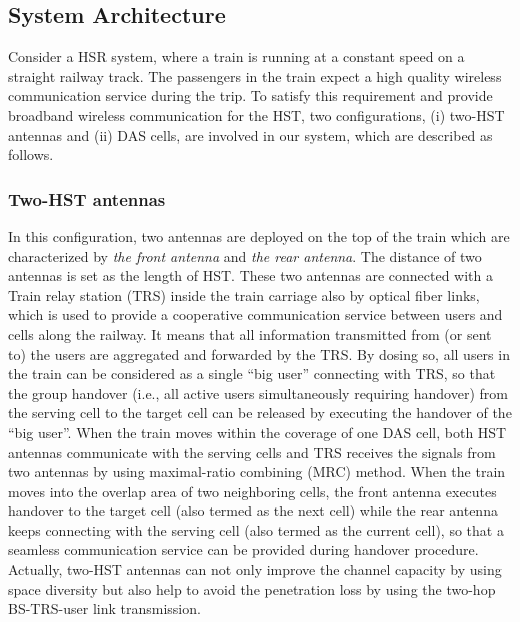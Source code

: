 \documentclass[a4paper,twocolumn,10pt]{IEEEtran}
\begin{document}
\subsection{System Architecture}
Consider a HSR system, where a train is running at a constant speed  on a straight railway track. The passengers in the train expect a high quality wireless communication service during the trip. To satisfy this requirement and provide broadband wireless communication for the HST, two configurations, (i) two-HST antennas and (ii) DAS cells, are involved in our system, which are described as follows.

\subsubsection{Two-HST antennas} In this configuration, two antennas are deployed on the top of the train which are characterized  by \textit{the front antenna} and \textit{the rear antenna}. The distance of two antennas is set as the length of HST. These two antennas are connected with a Train relay station (TRS) inside the train carriage also by optical fiber links, which is used to provide a cooperative communication service between users and cells along the railway. It means that all information transmitted from (or sent to) the users are aggregated and forwarded by the TRS. By dosing so, all users in the train can be considered as a single ``big user'' connecting with TRS, so that the group handover (i.e., all active users simultaneously requiring handover) from the serving cell to the target cell can be released by executing the handover of the ``big user''. When the train moves within the coverage of one DAS cell, both HST antennas communicate with the serving cells and TRS receives the signals from two antennas by using maximal-ratio combining (MRC) method. When the train moves into the overlap area of two neighboring cells, the front antenna executes handover to the target cell (also termed as the next cell) while the rear antenna keeps connecting with the serving cell (also termed as the current cell), so that a seamless communication service can be provided during handover procedure. Actually, two-HST antennas can not only improve the channel capacity by using space diversity but also help to avoid the penetration loss by using the two-hop BS-TRS-user link transmission.
\end{document}
